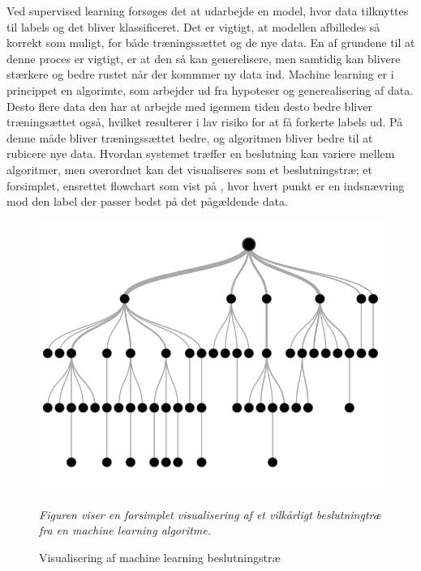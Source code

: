 Ved supervised learning forsøges det at udarbejde en model, hvor data tilknyttes til labels og det bliver klassificeret. Det er vigtigt, at modellen afbilledes så korrekt som muligt, for både træningssættet og de nye data. En af grundene til at denne proces er vigtigt, er at den så kan generelisere, men samtidig kan blivere stærkere og bedre rustet når der kommmer ny data ind. Machine learning er i princippet en algorimte, som arbejder ud fra hypoteser og generealisering af data. Desto flere data den har at arbejde med igennem tiden desto bedre bliver træningsættet også, hvilket resulterer i lav risiko for at få forkerte labels ud. På denne måde bliver træningssættet bedre, og algoritmen bliver bedre til at rubicere nye data.\cite{DIKU2010} Hvordan systemet træffer en beslutning kan variere mellem algoritmer, men overordnet kan det visualiseres som et beslutningstræ; et forsimplet, ensrettet flowchart som vist på , hvor hvert punkt er en indsnævring mod den label der passer bedst på det pågældende data.\cite{Barber2012}

\begin{figure}[H]
	\centering
	\includegraphics[scale=.4]{figures/dt.png}
	\caption{Visualisering af machine learning beslutningstræ}
	\label{dt}
	\textit{Figuren viser en forsimplet visualisering af et vilkårligt beslutningtræ fra en machine learning algoritme.\cite{Saraswat2016}}
\end{figure}


